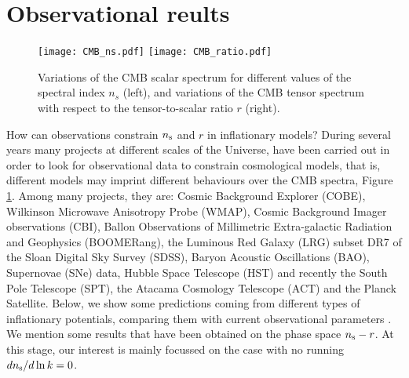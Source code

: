 \documentclass{rmaa}
\begin{document}
\section{Observational reults}

 \begin{figure}
 \begin{center}
  \texttt{[image: CMB\_ns.pdf]}
  \texttt{[image: CMB\_ratio.pdf]}
	\caption{Variations
	of the CMB scalar spectrum for different values of the spectral index $n_s$ (left), 
	and variations of the CMB tensor spectrum with respect to the tensor-to-scalar ratio $r$ (right).}
	\label{fig:CMB_spectra}
 \end{center}	
\end{figure}

How can observations constrain $n_{\rm s}$ and $r$ in inflationary models?
During several years many projects at different scales of the Universe, have been carried 
out in order to look for observational data to constrain cosmological models, that
is, different models may imprint different behaviours over the CMB spectra, Figure \ref{fig:CMB_spectra}.
Among many projects, they are:  
Cosmic Background Explorer (COBE), Wilkinson Microwave Anisotropy Probe (WMAP),
Cosmic Background Imager observations (CBI), Ballon Observations of Millimetric Extra-galactic 
Radiation and Geophysics (BOOMERang), the Luminous Red Galaxy (LRG) subset DR7 of the Sloan
Digital Sky Survey (SDSS), Baryon Acoustic Oscillations (BAO), Supernovae (SNe) data, 
Hubble Space Telescope (HST) and recently the South Pole Telescope (SPT), the 
Atacama Cosmology Telescope (ACT) and the Planck Satellite.
Below, we show some predictions coming from different types of inflationary potentials, 
comparing them with current observational parameters \citep{Mortonson11}.
We mention some results that have been obtained on the 
phase space $n_{\rm s}-r$. At this stage, our interest is mainly focussed 
on the case with no running $dn_{\rm s}/d\ln k =0$.
 \\
 
\end{document}
